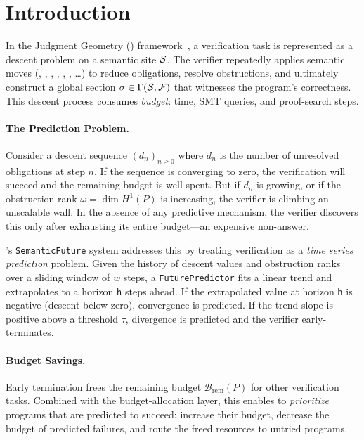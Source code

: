 \documentclass[11pt]{article}
\newcommand{\Horizon}{\mathsf{h}}           %
\newcommand{\Budget}{\mathcal{B}}           %
\newcommand{\BudgetRem}[1]{\Budget_{\mathrm{rem}}(#1)}
\newcommand{\DescentSeq}{(d_n)_{n\ge 0}}    %
\newcommand{\DescentN}{d_n}                 %
\newcommand{\ObsRank}{\omega}               %
\newcommand{\HOne}{H^1}                     %
\newcommand{\HOneProg}[1]{\HOne(#1)}        %
\newcommand{\Thresh}{\tau}                  %
\newcommand{\WindowSize}{w}                 %
\begin{document}
\section{Introduction}\label{sec:intro}

In the Judgment Geometry (\JuGeo) framework~\cite{paper01}, a
verification task is represented as a descent problem on a semantic
site $\mathcal{S}$.  The verifier repeatedly applies semantic moves
(\VERIFY, \CONSTRUCT, \NORMALIZE, \GLUE, \REPAIR, \PROMOTE, \ldots)
to reduce obligations, resolve obstructions, and ultimately construct a
global section $\sigma\in\Gamma(\mathcal{S},\mathcal{F})$ that witnesses the
program's correctness.  This descent process consumes \emph{budget}:
time, SMT queries, and proof-search steps.

\paragraph{The Prediction Problem.}
Consider a descent sequence $\DescentSeq$ where $\DescentN$ is the
number of unresolved obligations at step $n$.  If the sequence is
converging to zero, the verification will succeed and the remaining
budget is well-spent.  But if $\DescentN$ is growing, or if the
obstruction rank $\ObsRank = \dim \HOneProg{P}$ is increasing, the
verifier is climbing an unscalable wall.  In the absence of any
predictive mechanism, the verifier discovers this only after exhausting
its entire budget—an expensive non-answer.

\JuGeo's \texttt{SemanticFuture} system addresses this by treating
verification as a \emph{time series prediction} problem.  Given the
history of descent values and obstruction ranks over a sliding window of
$\WindowSize$ steps, a \texttt{FuturePredictor} fits a linear trend and
extrapolates to a horizon $\Horizon$ steps ahead.  If the extrapolated
value at horizon $\Horizon$ is negative (descent below zero),
convergence is predicted.  If the trend slope is positive above a
threshold $\Thresh$, divergence is predicted and the verifier
early-terminates.

\paragraph{Budget Savings.}
Early termination frees the remaining budget $\BudgetRem{P}$ for other
verification tasks.  Combined with the budget-allocation layer, this
enables \JuGeo{} to \emph{prioritize} programs that are predicted to
succeed: increase their budget, decrease the budget of predicted
failures, and route the freed resources to untried programs.
\end{document}
